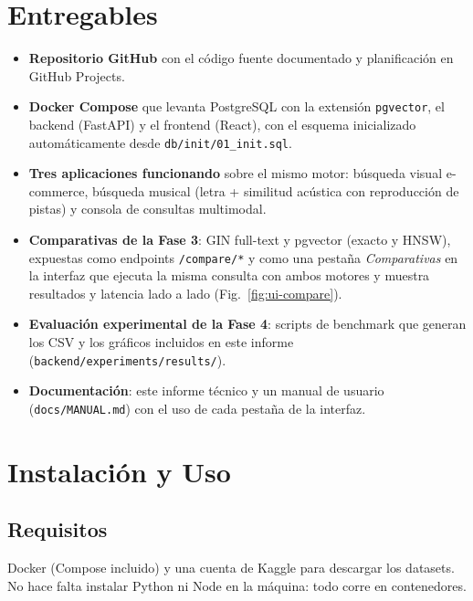 \documentclass[conference]{IEEEtran}
\begin{document}
\section{Entregables}

\begin{itemize}
  \item \textbf{Repositorio GitHub} con el código fuente documentado y
        planificación en GitHub Projects.
  \item \textbf{Docker Compose} que levanta PostgreSQL con la extensión
        \texttt{pgvector}, el backend (FastAPI) y el frontend (React), con
        el esquema inicializado automáticamente desde
        \texttt{db/init/01\_init.sql}.
  \item \textbf{Tres aplicaciones funcionando} sobre el mismo motor:
        búsqueda visual e-commerce, búsqueda musical (letra + similitud
        acústica con reproducción de pistas) y consola de consultas
        multimodal.
  \item \textbf{Comparativas de la Fase 3}: GIN full-text y pgvector (exacto
        y HNSW), expuestas como endpoints \texttt{/compare/*} y como una
        pestaña \textit{Comparativas} en la interfaz que ejecuta la misma
        consulta con ambos motores y muestra resultados y latencia lado a
        lado (Fig.~\ref{fig:ui-compare}).
  \item \textbf{Evaluación experimental de la Fase 4}: scripts de benchmark
        que generan los CSV y los gráficos incluidos en este informe
        (\texttt{backend/experiments/results/}).
  \item \textbf{Documentación}: este informe técnico y un manual de usuario
        (\texttt{docs/MANUAL.md}) con el uso de cada pestaña de la interfaz.
\end{itemize}

\section{Instalación y Uso}

\subsection{Requisitos}
Docker (Compose incluido) y una cuenta de Kaggle para descargar los
datasets. No hace falta instalar Python ni Node en la máquina: todo corre en
contenedores.
\end{document}
